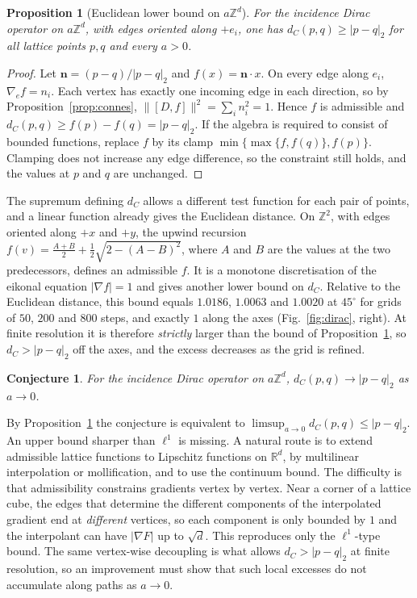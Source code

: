 \documentclass[11pt]{article}
\newtheorem{proposition}{Proposition}[section]
\newtheorem{conjecture}{Conjecture}
\theoremstyle{remark}\newtheorem*{remark}{Remark}
\newcommand{\ZZ}{\mathbb{Z}}
\newcommand{\RR}{\mathbb{R}}
\begin{document}
\begin{proposition}[Euclidean lower bound on $a\ZZ^d$]
\label{prop:connes_euclid}
For the incidence Dirac operator on $a\ZZ^d$, with edges oriented along $+e_i$, one has $d_C(p,q)\ge|p-q|_2$ for all
lattice points $p,q$ and every $a>0$.
\end{proposition}
\begin{proof}
Let $\mathbf n=(p-q)/|p-q|_2$ and $f(x)=\mathbf n\cdot x$. On every edge along $e_i$, $\nabla_ef=n_i$. Each vertex has exactly one
incoming edge in each direction, so by Proposition~\ref{prop:connes}, $\|[D,f]\|^2=\sum_in_i^2=1$. Hence $f$ is admissible
and $d_C(p,q)\ge f(p)-f(q)=|p-q|_2$. If the algebra is required to consist of bounded functions, replace $f$ by
its clamp $\min\{\max\{f,f(q)\},f(p)\}$. Clamping does not increase any edge difference, so the constraint still
holds, and the values at $p$ and $q$ are unchanged.
\end{proof}
The supremum defining $d_C$ allows a different test function for each pair of points, and a linear function
already gives the Euclidean distance. On $\ZZ^2$, with edges oriented along $+x$ and $+y$, the upwind recursion
$f(v)=\frac{A+B}{2}+\frac12\sqrt{2-(A-B)^2}$, where $A$ and $B$ are the values at the two predecessors, defines an
admissible $f$. It is a monotone discretisation of the eikonal equation $|\nabla f|=1$ and gives another lower bound on $d_C$.
Relative to the Euclidean distance, this bound equals $1.0186$, $1.0063$ and $1.0020$ at $45^\circ$ for grids of $50$,
$200$ and $800$ steps, and exactly $1$ along the axes (Fig.~\ref{fig:dirac}, right). At finite resolution it is
therefore \emph{strictly} larger than the bound of Proposition~\ref{prop:connes_euclid}, so $d_C>|p-q|_2$ off the axes,
and the excess decreases as the grid is refined.

\begin{conjecture}
For the incidence Dirac operator on $a\ZZ^d$, $d_C(p,q)\to|p-q|_2$ as $a\to0$.
\end{conjecture}
\noindent By Proposition~\ref{prop:connes_euclid} the conjecture is equivalent to
$\limsup_{a\to0}d_C(p,q)\le|p-q|_2$. An upper bound sharper than $\ell^1$ is missing. A natural route is to extend
admissible lattice functions to Lipschitz functions on $\RR^d$, by multilinear interpolation or mollification, and to
use the continuum bound. The difficulty is that admissibility constrains gradients vertex by vertex. Near a
corner of a lattice cube, the edges that determine the different components of the interpolated gradient end at
\emph{different} vertices, so each component is only bounded by $1$ and the interpolant can have $|\nabla F|$ up to
$\sqrt d$. This reproduces only the $\ell^1$-type bound. The same vertex-wise decoupling is what allows
$d_C>|p-q|_2$ at finite resolution, so an improvement must show that such local excesses do not accumulate along
paths as $a\to0$.
\end{document}
